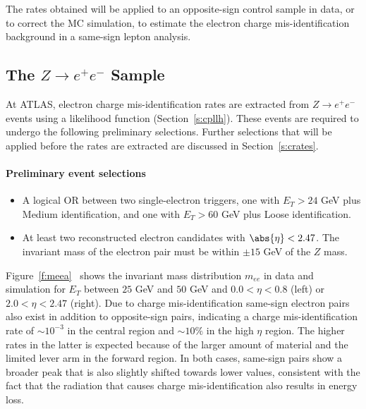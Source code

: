 The rates obtained will be applied to an opposite-sign control sample in data,
or to correct the MC simulation, to estimate the electron charge
mis-identification background in a same-sign lepton analysis.

\subsection{The $Z\to e^+e^-$ Sample}\label{s:zeerates}

At ATLAS, electron charge mis-identification rates are extracted from $Z\to
e^+e^-$ events using a likelihood function (Section~\ref{s:cpllh}). These
events are required to undergo the following preliminary selections. Further
selections that will be applied before the rates are extracted are discussed 
in Section~\ref{s:crates}.

\paragraph{Preliminary event selections}

\begin{itemize}

	\item A logical OR between two single-electron triggers, one with $E_T > 24$
	      GeV plus Medium identification, and one with $E_T > 60$ GeV plus Loose
	      identification.

	\item At least two reconstructed electron candidates with $\abs{\eta} < 2.47$.
	      The invariant mass of the electron pair must be within $\pm 15$ GeV of the $Z$ mass.

\end{itemize}

Figure~\ref{f:meea}~\cite{atlaselcid} shows the invariant mass distribution
$m_{ee}$ in data and simulation for $E_T$ between $25$ GeV and $50$ GeV and
$0.0 < \eta < 0.8$ (left) or $2.0 < \eta < 2.47$ (right). Due to charge
mis-identification same-sign electron pairs also exist in addition to
opposite-sign pairs, indicating a charge mis-identification rate of $\sim
10^{-3}$ in the central region and $\sim 10\%$ in the high $\eta$ region. The
higher rates in the latter is expected because of the larger amount of material
and the limited lever arm in the forward region. In both cases, same-sign pairs
show a broader peak that is also slightly shifted towards lower values,
consistent with the fact that the radiation that causes charge
mis-identification also results in energy loss.


